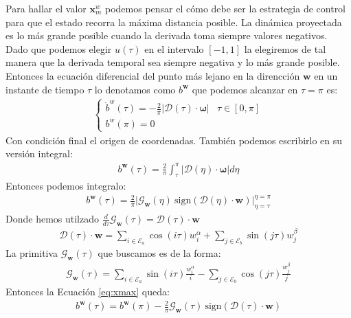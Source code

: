  
Para hallar el valor $\bm{x}_{m}^w$ podemos pensar el cómo debe ser la estrategia de control para que el estado recorra la máxima distancia posible. 
%
La dinámica proyectada es lo más grande posible cuando la derivada toma siempre valores negativos. 
% 
Dado que podemos elegir $u(\tau)$ en el intervalo $[-1,1]$ la elegiremos de tal manera que la derivada temporal sea siempre negativa y lo más grande posible. 
%
Entonces la ecuación diferencial del punto más lejano en la direncción $\bm{w}$ en un instante de tiempo $\tau$ lo denotamos como $b^{\bm{w}}$ que podemos alcanzar en $\tau = \pi$ es:
\begin{gather}
    \begin{cases}
        \displaystyle\dot{b}^w(\tau) = 
        - \frac{2}{\pi} 
        \big| \bm{\mathcal{D}}(\tau) \cdot \bm{\omega} \big|
        & \tau \in [0,\pi]\\[6pt]
        \displaystyle b^w(\pi) =  0
    \end{cases}
\end{gather}
Con condición final el origen de coordenadas. También podemos escribirlo en  su versión integral:
\begin{gather}
   b^{\bm{w}}(\tau) = \frac{2}{\pi} \int_\tau^{\pi}
    \big| \bm{\mathcal{D}}(\eta) \cdot \bm{\omega} \big| d\eta
\end{gather}
Entonces podemos integralo:
\begin{gather}\label{eq:xmax}
   b^{\bm{w}}(\tau) =  
    \frac{2}{\pi} \Big|  \mathcal{G}_{\bm{w}}(\eta) \
    \text{sign}(\bm{\mathcal{D}}(\eta) \cdot \bm{w})\Big|_{\eta=\tau}^{\eta=\pi}
\end{gather}
Donde hemos utilzado $\frac{d}{d\tau} \mathcal{G}_{\bm{w}}(\tau) =  \bm{\mathcal{D}}
(\tau) \cdot \bm{w}$
\begin{gather}
    \bm{\mathcal{D}}(\tau) \cdot \bm{w} = 
    \sum_{i \in \mathcal{E}_a}  \cos(i\tau)w^\alpha_i+ 
    \sum_{j \in \mathcal{E}_b}  \sin(j\tau)w^\beta_j
\end{gather}
La primitiva $\mathcal{G}_{\bm{w}}(\tau)$ que buscamos es de la forma: 
\begin{gather}
    \mathcal{G}_{\bm{w}}(\tau) =  
    \sum_{i \in \mathcal{E}_a}  \sin(i\tau)\frac{w^\alpha_i}{i} - 
    \sum_{j \in \mathcal{E}_b}  \cos(j\tau)\frac{w^\beta_j}{j}
\end{gather}
Entonces la Ecuación \eqref{eq:xmax} queda:
\begin{gather}
   b^{\bm{w}}(\tau) =  b^{\bm{w}}(\pi) - \frac{2}{\pi} \mathcal{G}_{\bm{w}}(\tau) \ \text{sign}(\bm{\mathcal{D}}(\tau) \cdot \bm{w})
\end{gather}
